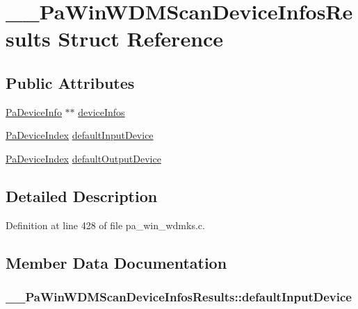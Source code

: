 \hypertarget{struct_____pa_win_w_d_m_scan_device_infos_results}{}\section{\+\_\+\+\_\+\+Pa\+Win\+W\+D\+M\+Scan\+Device\+Infos\+Results Struct Reference}
\label{struct_____pa_win_w_d_m_scan_device_infos_results}
\subsection*{Public Attributes}
\begin{DoxyCompactItemize}
\item 
\hyperlink{struct_pa_device_info}{Pa\+Device\+Info} $\ast$$\ast$ \hyperlink{struct_____pa_win_w_d_m_scan_device_infos_results_a2fe91f3f6605d7624f4b47f4b43aa5c1}{device\+Infos}
\item 
\hyperlink{portaudio_8h_ad79317e65bde63d76c4b8e711ac5a361}{Pa\+Device\+Index} \hyperlink{struct_____pa_win_w_d_m_scan_device_infos_results_ada9f50c629190a27cff9479fc24fc3fa}{default\+Input\+Device}
\item 
\hyperlink{portaudio_8h_ad79317e65bde63d76c4b8e711ac5a361}{Pa\+Device\+Index} \hyperlink{struct_____pa_win_w_d_m_scan_device_infos_results_ae035601f901c22bee7f4d4fb456e6f27}{default\+Output\+Device}
\end{DoxyCompactItemize}


\subsection{Detailed Description}


Definition at line 428 of file pa\+\_\+win\+\_\+wdmks.\+c.



\subsection{Member Data Documentation}
\subsubsection[{\texorpdfstring{default\+Input\+Device}{defaultInputDevice}}]{ \+\_\+\+\_\+\+Pa\+Win\+W\+D\+M\+Scan\+Device\+Infos\+Results\+::default\+Input\+Device}\hypertarget{struct_____pa_win_w_d_m_scan_device_infos_results_ada9f50c629190a27cff9479fc24fc3fa}{}\label{struct_____pa_win_w_d_m_scan_device_infos_results_ada9f50c629190a27cff9479fc24fc3fa}



